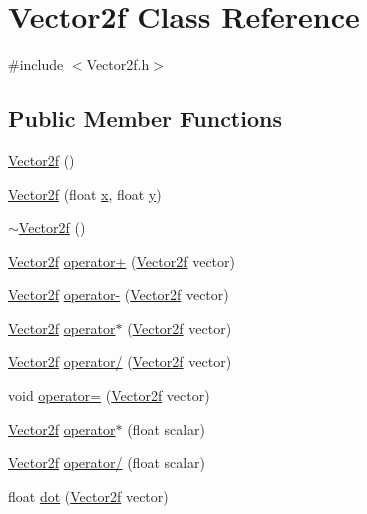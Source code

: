 \hypertarget{class_vector2f}{\section{Vector2f Class Reference}
\label{class_vector2f}
}


{\ttfamily \#include $<$Vector2f.\-h$>$}

\subsection*{Public Member Functions}
\begin{DoxyCompactItemize}
\item 
\hyperlink{class_vector2f_a3db9a868c58bc809e5e09a88d65a77ec}{Vector2f} ()
\item 
\hyperlink{class_vector2f_ae3ff9026b0e1242471678e4f2ed8be0e}{Vector2f} (float \hyperlink{class_vector2f_add58d2378e3a3abdb76cf0ac51c9acfc}{x}, float \hyperlink{class_vector2f_a14874a72597fd358b15f8ba34b999c4d}{y})
\item 
\hyperlink{class_vector2f_a2f820078721656f1952f46b0861e19ef}{$\sim$\-Vector2f} ()
\item 
\hyperlink{class_vector2f}{Vector2f} \hyperlink{class_vector2f_acab3acffc23f8bf9ba36d61e06134e87}{operator+} (\hyperlink{class_vector2f}{Vector2f} vector)
\item 
\hyperlink{class_vector2f}{Vector2f} \hyperlink{class_vector2f_aabf72717e6da6001e9a3d01aeb9b2fc6}{operator-\/} (\hyperlink{class_vector2f}{Vector2f} vector)
\item 
\hyperlink{class_vector2f}{Vector2f} \hyperlink{class_vector2f_ab80cdeb3e397a1b721333efa7dc2b413}{operator$\ast$} (\hyperlink{class_vector2f}{Vector2f} vector)
\item 
\hyperlink{class_vector2f}{Vector2f} \hyperlink{class_vector2f_a5c633ed193d68fe42094e226b7ed4b2e}{operator/} (\hyperlink{class_vector2f}{Vector2f} vector)
\item 
void \hyperlink{class_vector2f_a5e7851b6e79d053d18d8330bd368043b}{operator=} (\hyperlink{class_vector2f}{Vector2f} vector)
\item 
\hyperlink{class_vector2f}{Vector2f} \hyperlink{class_vector2f_a580187e290048e034ec42c389e170f9e}{operator$\ast$} (float scalar)
\item 
\hyperlink{class_vector2f}{Vector2f} \hyperlink{class_vector2f_a1af75ea153e922fed0ea92bb68950157}{operator/} (float scalar)
\item 
float \hyperlink{class_vector2f_a28ef3af858da3c412cfb1522cff08a1f}{dot} (\hyperlink{class_vector2f}{Vector2f} vector)

\end{DoxyCompactItemize}
